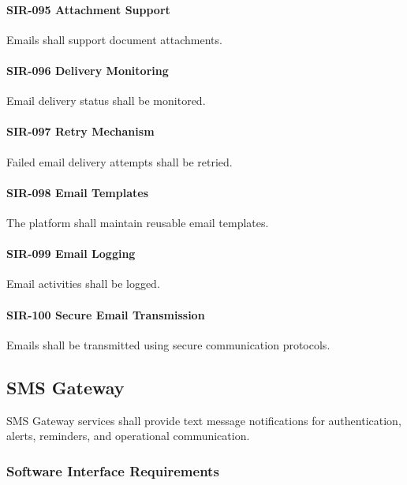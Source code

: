 \paragraph{SIR-095 Attachment Support}

Emails shall support document attachments.

\paragraph{SIR-096 Delivery Monitoring}

Email delivery status shall be monitored.

\paragraph{SIR-097 Retry Mechanism}

Failed email delivery attempts shall be retried.

\paragraph{SIR-098 Email Templates}

The platform shall maintain reusable email templates.

\paragraph{SIR-099 Email Logging}

Email activities shall be logged.

\paragraph{SIR-100 Secure Email Transmission}

Emails shall be transmitted using secure communication protocols.


\subsection{SMS Gateway}

SMS Gateway services shall provide text message notifications for
authentication, alerts, reminders, and operational communication.


\subsubsection*{Software Interface Requirements}

